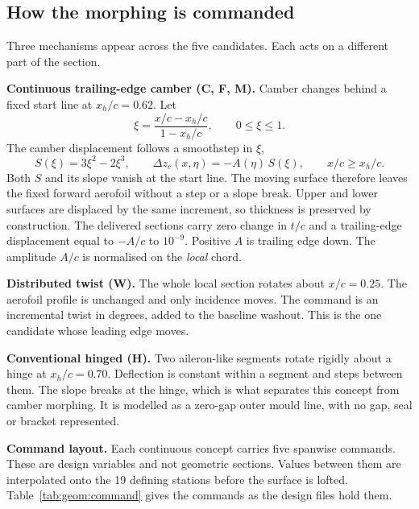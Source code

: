 \subsection{How the morphing is commanded}
\label{sec:geom:law}

Three mechanisms appear across the five candidates. Each acts on a different part of the section.

\textbf{Continuous trailing-edge camber (C, F, M).} Camber changes behind a fixed start line at
$x_h/c = 0.62$. Let
\begin{equation}
  \xi = \frac{x/c - x_h/c}{1 - x_h/c}, \qquad 0 \le \xi \le 1 .
\end{equation}
The camber displacement follows a smoothstep in $\xi$,
\begin{equation}
  S(\xi) = 3\xi^{2} - 2\xi^{3}, \qquad
  \Delta z_c(x,\eta) = -A(\eta)\,S(\xi), \qquad x/c \ge x_h/c .
\end{equation}
Both $S$ and its slope vanish at the start line. The moving surface therefore leaves the fixed
forward aerofoil without a step or a slope break. Upper and lower surfaces are displaced by the
same increment, so thickness is preserved by construction. The delivered sections carry zero
change in $t/c$ and a trailing-edge displacement equal to $-A/c$ to $10^{-9}$. Positive $A$ is
trailing edge down. The amplitude $A/c$ is normalised on the \emph{local} chord.

\textbf{Distributed twist (W).} The whole local section rotates about $x/c = 0.25$. The aerofoil
profile is unchanged and only incidence moves. The command is an incremental twist in degrees,
added to the baseline washout. This is the one candidate whose leading edge moves.

\textbf{Conventional hinged (H).} Two aileron-like segments rotate rigidly about a hinge at
$x_h/c = 0.70$. Deflection is constant within a segment and steps between them. The slope breaks
at the hinge, which is what separates this concept from camber morphing. It is modelled as a
zero-gap outer mould line, with no gap, seal or bracket represented.

\textbf{Command layout.} Each continuous concept carries five spanwise commands. These are design
variables and not geometric sections. Values between them are interpolated onto the 19 defining
stations before the surface is lofted. Table~\ref{tab:geom:command} gives the commands as the
design files hold them.

